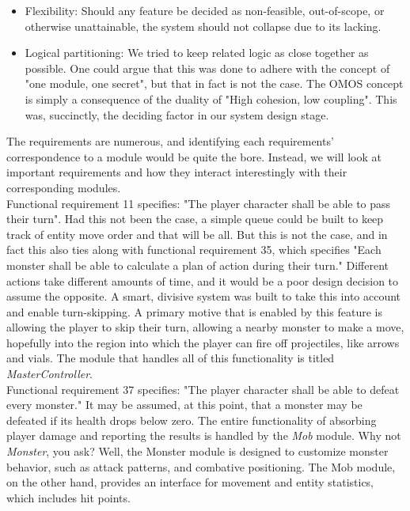 \documentclass[12pt, titlepage]{article}
\begin{document}
	\begin{itemize}
		\item Flexibility: Should any feature be decided as non-feasible, out-of-scope, or otherwise unattainable, the system should not collapse due to its lacking.
		\item Logical partitioning: We tried to keep related logic as close together as possible. One could argue that this was done to adhere with the concept of "one module, one secret", but that in fact is not the case. The OMOS concept is simply a consequence of the duality of "High cohesion, low coupling". This was, succinctly, the deciding factor in our system design stage.
	\end{itemize}

	The requirements are numerous, and identifying each requirements' correspondence to a module would be quite the bore. Instead, we will look at important requirements and how they interact interestingly with their corresponding modules.\\

	Functional requirement 11 specifies: "The player character shall be able to pass their turn". Had this not been the case, a simple queue could be built to keep track of entity move order and that will be all. But this is not the case, and in fact this also ties along with functional requirement 35, which specifies "Each monster shall be able to calculate a plan of action during their turn." Different actions take different amounts of time, and it would be a poor design decision to assume the opposite. A smart, divisive system was built to take this into account and enable turn-skipping. A primary motive that is enabled by this feature is allowing the player to skip their turn, allowing a nearby monster to make a move, hopefully into the region into which the player can fire off projectiles, like arrows and vials. The module that handles all of this functionality is titled \textit{MasterController}.\\

	Functional requirement 37 specifies: "The player character shall be able to defeat every monster." It may be assumed, at this point, that a monster may be defeated if its health drops below zero. The entire functionality of absorbing player damage and reporting the results is handled by the \textit{Mob} module. Why not \textit{Monster}, you ask? Well, the Monster module is designed to customize monster behavior, such as attack patterns, and combative positioning. The Mob module, on the other hand, provides an interface for movement and entity statistics, which includes hit points.\\
\end{document}
